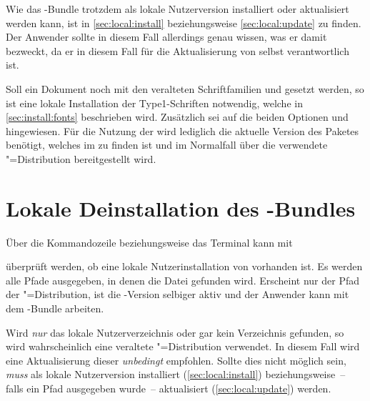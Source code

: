 Wie das \TUDScript-Bundle trotzdem als lokale Nutzerversion installiert oder 
aktualisiert werden kann, ist in \autoref{sec:local:install} beziehungsweise 
\autoref{sec:local:update} zu finden. Der Anwender sollte in diesem Fall 
allerdings genau wissen, was er damit bezweckt, da er in diesem Fall für die 
Aktualisierung von \TUDScript selbst verantwortlich ist.

%
%
Soll ein Dokument noch mit den veralteten Schriftfamilien \Univers und \DIN 
gesetzt werden, so ist eine lokale Installation der Type1-Schriften notwendig, 
welche in \autoref{sec:install:fonts} beschrieben wird. Zusätzlich sei auf die 
beiden Optionen  und  hingewiesen. 
Für die Nutzung der \OpenSans wird lediglich die aktuelle Version des Paketes 
 benötigt, welches im  zu finden ist und 
im Normalfall über die verwendete "=Distribution bereitgestellt 
wird.



\section{%
  Lokale Deinstallation des \TUDScript-Bundles%
  \label{sec:local:uninstall}%
}
Über die Kommandozeile beziehungsweise das Terminal kann mit
%
\begin{quoting}
\end{quoting}
%
überprüft werden, ob eine lokale Nutzerinstallation von \TUDScript vorhanden 
ist. Es werden alle Pfade ausgegeben, in denen die Datei  
gefunden wird. Erscheint nur der Pfad der "=Distribution, ist die 
\TUDScript-Version selbiger aktiv und der Anwender kann mit dem 
\TUDScript-Bundle arbeiten.

Wird \emph{nur} das lokale Nutzerverzeichnis oder gar kein Verzeichnis 
gefunden, so wird wahrscheinlich eine veraltete "=Distribution 
verwendet. In diesem Fall wird eine Aktualisierung dieser \emph{unbedingt} 
empfohlen. Sollte dies nicht möglich sein, \emph{muss} \TUDScript als lokale 
Nutzerversion installiert (\autoref{sec:local:install}) beziehungsweise~-- 
falls ein Pfad ausgegeben wurde~-- aktualisiert (\autoref{sec:local:update}) 
werden.

